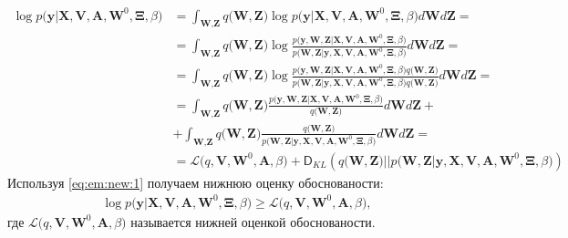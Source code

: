 \[
\label{eq:em:new:1}
\begin{aligned}
\log p\bigr(\mathbf{y}|\mathbf{X}, \mathbf{V}, \textbf{A}, \textbf{W}^{0}, \bm{\Xi}, \beta\bigr) &= \int_{\textbf{W}, \textbf{Z}} q\bigr(\textbf{W}, \textbf{Z}\bigr) \log p\bigr(\mathbf{y}|\mathbf{X}, \mathbf{V}, \textbf{A}, \textbf{W}^{0}, \bm{\Xi}, \beta\bigr)d\textbf{W}d\textbf{Z} =\\
&= \int_{\textbf{W}, \textbf{Z}} q\bigr(\textbf{W}, \textbf{Z}\bigr)\log \frac{p\bigr(\mathbf{y}, \textbf{W}, \textbf{Z}|\mathbf{X}, \mathbf{V}, \textbf{A}, \textbf{W}^{0}, \bm{\Xi}, \beta\bigr)}{p\bigr(\textbf{W}, \textbf{Z}|\mathbf{y}, \mathbf{X}, \mathbf{V}, \textbf{A}, \textbf{W}^{0}, \bm{\Xi}, \beta\bigr)}d\textbf{W}d\textbf{Z}=\\
&= \int_{\textbf{W}, \textbf{Z}} q\bigr(\textbf{W}, \textbf{Z}\bigr)\log \frac{p\bigr(\mathbf{y}, \textbf{W}, \textbf{Z}|\mathbf{X}, \mathbf{V}, \textbf{A}, \textbf{W}^{0}, \bm{\Xi}, \beta\bigr)q\bigr(\textbf{W}, \textbf{Z}\bigr)}{p\bigr(\textbf{W}, \textbf{Z}|\mathbf{y}, \mathbf{X}, \mathbf{V}, \textbf{A}, \textbf{W}^{0}, \bm{\Xi}, \beta\bigr)q\bigr(\textbf{W}, \textbf{Z}\bigr)}d\textbf{W}d\textbf{Z}=\\
&= \int_{\textbf{W}, \textbf{Z}} q\bigr(\textbf{W}, \textbf{Z}\bigr)\frac{p\bigr(\mathbf{y}, \textbf{W}, \textbf{Z}|\mathbf{X}, \mathbf{V}, \textbf{A}, \textbf{W}^{0}, \bm{\Xi}, \beta\bigr)}{q\bigr(\textbf{W}, \textbf{Z}\bigr)}d\textbf{W}d\textbf{Z}+\\
&+\int_{\textbf{W}, \textbf{Z}} q\bigr(\textbf{W}, \textbf{Z}\bigr)\frac{q\bigr(\textbf{W}, \textbf{Z}\bigr)}{p\bigr(\textbf{W}, \textbf{Z}|\mathbf{y}, \mathbf{X}, \mathbf{V}, \textbf{A}, \textbf{W}^{0}, \bm{\Xi}, \beta\bigr)}d\textbf{W}d\textbf{Z}=\\
&=\mathcal{L}\bigr(q, \textbf{V}, \textbf{W}^{0}, \textbf{A}, \beta\bigr)+\mathsf{D}_{KL}\left(q\bigr(\textbf{W}, \textbf{Z}\bigr)||p\bigr(\textbf{W}, \textbf{Z}|\mathbf{y}, \mathbf{X}, \mathbf{V}, \textbf{A}, \textbf{W}^{0}, \bm{\Xi}, \beta\bigr)\right)
\end{aligned}
\]
Используя \eqref{eq:em:new:1} получаем нижнюю оценку обоснованости:
\[
\label{eq:em:new:2}
\begin{aligned}
\log p\bigr(\mathbf{y}|\mathbf{X}, \mathbf{V}, \textbf{A}, \textbf{W}^{0}, \bm{\Xi}, \beta\bigr)\geq \mathcal{L}\bigr(q, \textbf{V}, \textbf{W}^{0}, \textbf{A}, \beta\bigr),
\end{aligned}
\]
где $\mathcal{L}\bigr(q, \textbf{V}, \textbf{W}^{0}, \textbf{A}, \beta\bigr)$ называется нижней оценкой обоснованости.

